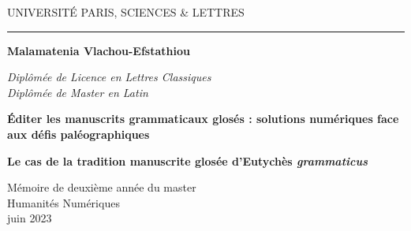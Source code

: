 \documentclass[a4paper, twoside, 12pt]{book}
\begin{document}
\frontmatter



\begin{titlepage}
\begin{center}

\bigskip

\begin{large}
UNIVERSITÉ PARIS, SCIENCES \& LETTRES
\end{large}

\begin{center}\rule{2cm}{0.02cm}\end{center}

\bigskip
\bigskip
\bigskip
\begin{Large}
\textbf{Malamatenia Vlachou-Efstathiou}\\
\end{Large}
\begin{normalsize}
\textit{Diplômée de Licence en Lettres Classiques}\\
\textit{Diplômée de Master en Latin}\\
\end{normalsize}

\bigskip
\bigskip
\bigskip

\begin{Huge}
\textbf{Éditer les manuscrits grammaticaux glosés : solutions numériques face aux défis paléographiques}\\
\end{Huge}

\bigskip
\bigskip
\begin{LARGE}
\textbf{Le cas de la tradition manuscrite glosée d'Eutychès \textit{grammaticus}}\\
\end{LARGE}

\bigskip
\bigskip
\bigskip
\vfill

\begin{large}
Mémoire de deuxième année du master\\
\og Humanités Numériques \fg{} \\
\bigskip
juin 2023
\end{large}

\end{center}
\end{titlepage}
\end{document}
